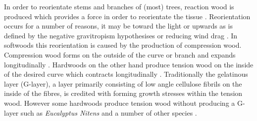 In order to reorientate stems and branches of (most) trees, reaction wood is
produced which provides a force in order to reorientate the tissue \cite{gardiner2014biology}.
Reorientation occurs for a number of reasons, it may be toward the light or upwards as is defined by the
negative gravitropism hypothesises or reducing wind drag \cite{niklas2012plant}\cite{coutts1995wind}. In softwoods this
reorientation is caused by the production of compression wood. Compression wood
forms on the outside of the curve or branch and expands longitudinally \cite{timell1986compression}. Hardwoods
on the other hand produce tension wood on the inside of the desired curve which
contracts longitudinally \cite{gardiner2014biology}. Traditionally the
gelatinous layer (G-layer), a layer primarily consisting of low angle cellulose
fibrils on the inside of the fibres, is credited with forming growth stresses
within the tension wood. However some hardwoods produce tension wood
without producing a G-layer such as \textit{Eucalyptus Nitens} \cite{Qiu_2008} and a number of other species \cite{Ruelle_2006}.
